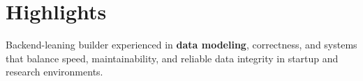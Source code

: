 \section{Highlights}

\begin{onecolentry}
    \begin{highlightsforbulletentries}

    \item Backend-leaning builder experienced in \textbf{data modeling}, correctness, and systems that balance speed, maintainability, and reliable data integrity in startup and research environments.

    \end{highlightsforbulletentries}
\end{onecolentry}